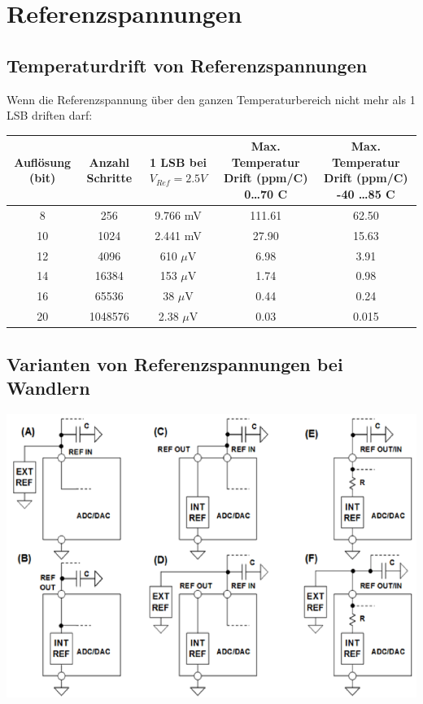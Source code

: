 \section{Referenzspannungen} 

\subsection{Temperaturdrift von Referenzspannungen}
Wenn die Referenzspannung über den ganzen Temperaturbereich nicht mehr als 1 LSB driften darf:

\begin{tabular}{|c|c|c|c|c|}
	\hline
	Auflösung (bit)	& 
	Anzahl Schritte	& 
	1 LSB bei $V_{Ref} = 2.5 V$	& 
	\multicolumn{1}{p{4cm}|}{Max. Temperatur Drift (ppm/\textdegree C) 0\ldots70 \textdegree C} &
	\multicolumn{1}{p{4cm}|}{Max. Temperatur Drift (ppm/\textdegree C) -40 \ldots 85 \textdegree C}
	\\ \hline
	8 	& 256	& 9.766 mV 		& 111.61	& 62.50
	\\ \hline
	10	& 1024	& 2.441 mV		& 27.90		& 15.63
	\\ \hline 
	12	& 4096	& 610 $\mu$V	& 6.98		& 3.91
	\\ \hline
	14	& 16384	& 153 $\mu$V	& 1.74		& 0.98
	\\ \hline
	16	& 65536	& 38 $\mu$V		& 0.44		& 0.24
	\\ \hline
	20	& 1048576	& 2.38 $\mu$V	& 0.03	& 0.015
	\\ \hline 
\end{tabular}


\subsection{Varianten von Referenzspannungen bei Wandlern}
\includegraphics[scale=0.3]{pictures/variantenReferenzspannungen}



